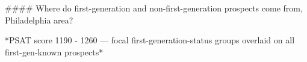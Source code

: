 #### Where do first-generation and non-first-generation prospects come from, Philadelphia area?

*PSAT score 1190 - 1260 — focal first-generation-status groups overlaid on all first-gen-known prospects*
